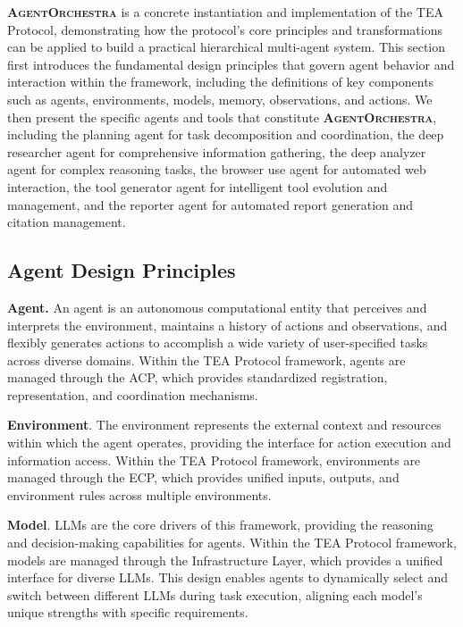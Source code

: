 \documentclass[11pt]{article}
\newcommand{\projectname}{\textbf{\textsc{AgentOrchestra}}\xspace}
\begin{document}
\projectname is a concrete instantiation and implementation of the TEA Protocol, demonstrating how the protocol's core principles and transformations can be applied to build a practical hierarchical multi-agent system. This section first introduces the fundamental design principles that govern agent behavior and interaction within the framework, including the definitions of key components such as agents, environments, models, memory, observations, and actions. We then present the specific agents and tools that constitute \projectname, including the planning agent for task decomposition and coordination, the deep researcher agent for comprehensive information gathering, the deep analyzer agent for complex reasoning tasks, the browser use agent for automated web interaction, the tool generator agent for intelligent tool evolution and management, and the reporter agent for automated report generation and citation management.

\subsection{Agent Design Principles}
\label{appx_sec:agent_design_principles}

\textbf{Agent.} An agent is an autonomous computational entity that perceives and interprets the environment, maintains a history of actions and observations, and flexibly generates actions to accomplish a wide variety of user-specified tasks across diverse domains. Within the TEA Protocol framework, agents are managed through the ACP, which provides standardized registration, representation, and coordination mechanisms.

\textbf{Environment}. The environment represents the external context and resources within which the agent operates, providing the interface for action execution and information access. Within the TEA Protocol framework, environments are managed through the ECP, which provides unified inputs, outputs, and environment rules across multiple environments.

\textbf{Model}. LLMs are the core drivers of this framework, providing the reasoning and decision-making capabilities for agents. Within the TEA Protocol framework, models are managed through the Infrastructure Layer, which provides a unified interface for diverse LLMs. This design enables agents to dynamically select and switch between different LLMs during task execution, aligning each model's unique strengths with specific requirements.
\end{document}
